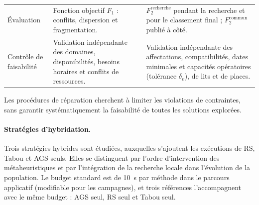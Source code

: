 \documentclass[11pt,a4paper]{article}
\begin{document}
\begin{table}[htbp]
\begin{tabularx}{\linewidth}{@{}p{2.3cm}XX@{}}
Évaluation &
Fonction objectif $F_1$ : conflits, dispersion et fragmentation. &
$F_2^{\mathrm{recherche}}$ pendant la recherche et pour le classement final ; $F_2^{\mathrm{commun}}$ publié à côté. \\

Contrôle de faisabilité &
Validation indépendante des domaines, disponibilités, besoins horaires et conflits de ressources. &
Validation indépendante des affectations, compatibilités, dates minimales et capacités opératoires (tolérance $\delta_v$), de lits et de places. \\

\bottomrule
\end{tabularx}
\end{table}

Les procédures de réparation cherchent à limiter les violations de contraintes, sans garantir systématiquement la faisabilité de toutes les solutions explorées.

\paragraph{Stratégies d'hybridation.}

Trois stratégies hybrides sont étudiées, auxquelles s’ajoutent les exécutions de RS, Tabou et AGS seuls. Elles se distinguent par l'ordre d'intervention des métaheuristiques et par l'intégration de la recherche locale dans l'évolution de la population. Le budget standard est de 10~s par méthode dans le parcours applicatif (modifiable pour les campagnes), et trois références l'accompagnent avec le même budget : AGS seul, RS seul et Tabou seul.
\end{document}

